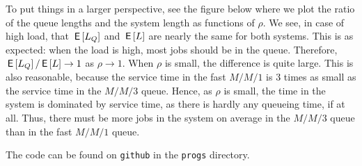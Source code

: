 \begin{exercise}
\begin{solution}
To put things in a larger perspective, see
the figure below where we plot the ratio of the queue
lengths and the system length as functions of $\rho$. We see, in case
of high load, that $\,\mathsf{E}\left[L_Q\right]$ and $\,\mathsf{E}\left[L\right]$ are nearly the same for both
systems. This is as expected: when the load is high, most jobs should
be in the queue. Therefore, $\,\mathsf{E}\left[L_Q\right]/\,\mathsf{E}\left[L\right] \to 1$ as $\rho\to 1$. When
$\rho$ is small, the difference is quite large. This is also
reasonable, because the service time in the fast $M/M/1$ is 3 times as
small as the service time in the $M/M/3$ queue. Hence, as $\rho$ is
small, the time in the system is dominated by service time, as there
is hardly any queueing time, if at all.  Thus, there must be more jobs
in the system on average in the $M/M/3$ queue than in the fast $M/M/1$
queue.

\begin{center}

\end{center}

The  code can be found on \texttt{github} in the \texttt{progs} directory.
\end{solution}
\end{exercise}


